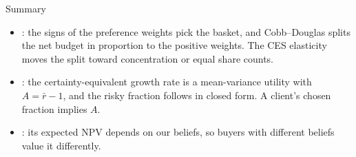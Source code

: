 \documentclass[aspectratio=169,11pt]{beamer}
\begin{document}
\begin{frame}{Summary}
\begin{itemize}\setlength{\itemsep}{0.9em}
\item {}: the signs of the preference weights pick the basket, and Cobb--Douglas
splits the net budget in proportion to the positive weights. The CES elasticity moves
the split toward concentration or equal share counts.
\item {}: the
certainty-equivalent growth rate is a mean-variance utility with $A=\bar r-1$, and
the risky fraction follows in closed form. A client's chosen fraction implies $A$.
\item {}: its
expected NPV depends on our beliefs, so buyers with different beliefs value it differently.
\end{itemize}
\end{frame}

\end{document}
